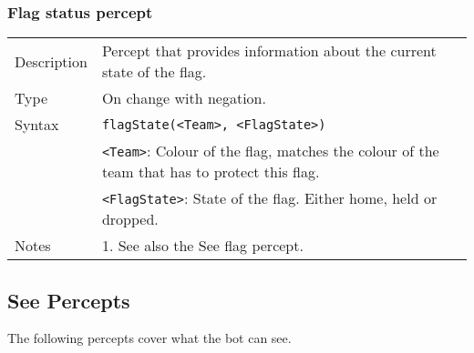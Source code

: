 \documentclass[11pt,a4paper]{article}
\begin{document}
\subsubsection*{Flag status percept}
\begin{small}
\begin{tabular}{p{2cm}p{9cm}}
Description & Percept that provides information about the current state of the flag.\\
Type & On change with negation.\\
Syntax & \verb|flagState(<Team>, <FlagState>)|\\
& \verb|<Team>|: Colour of the flag, matches the colour of the team that has to protect this flag.\\ 
& \verb|<FlagState>|: State of the flag. Either home, held or dropped.\\
Notes & 
	1.	See also the See flag percept.
\end{tabular}
\end{small}

\subsection{See Percepts}
The following percepts cover what the bot can see. 
\end{document}
